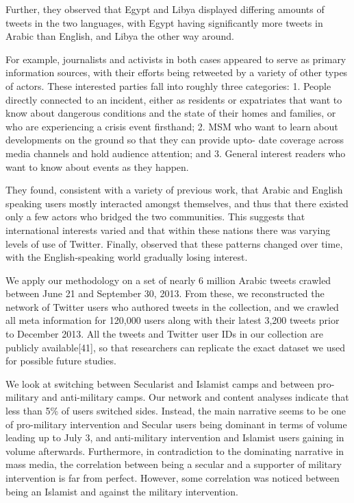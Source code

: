 	\cite{bruns_arab_2013}
		Further, they observed that Egypt and Libya displayed differing amounts of tweets in the two languages, with Egypt having significantly more tweets in Arabic than English, and Libya the other way around.

\cite{lotan_revolutions_2011}
For example, journalists and activists in both cases appeared to serve as primary information sources, with their efforts being retweeted by a variety of other types of actors.    
These interested parties fall into roughly three categories:
1. People directly connected to an incident, either as residents or expatriates that want to
know about dangerous conditions and the state of their homes and families, or who are
experiencing a crisis event firsthand;
2. MSM who want to learn about developments on the ground so that they can provide upto-
date coverage across media channels and hold audience attention; and
3. General interest readers who want to know about events as they happen.

\cite{bruns_arab_2013}   They found, consistent with a variety of previous work, that Arabic and English speaking users mostly interacted amongst themselves, and thus that there existed only a few actors who bridged the two communities.    This suggests that international interests varied and that within these nations there was varying levels of use of Twitter.  Finally, \cite{bruns_arab_2013} observed that these patterns changed over time, with the English-speaking world gradually losing interest. 	

\cite{borge-holthoefer_content_2014}

	We apply our methodology on a set of nearly 6 million Arabic tweets crawled between June 21 and September 30, 2013. From these, we reconstructed the network of Twitter users who authored tweets in the collection, and we crawled all meta information for 120,000 users along with their latest 3,200 tweets prior to December 2013. All the tweets and Twitter user IDs in our collection are publicly available[41], so that researchers can replicate the exact dataset we used for possible future studies.
	
	We look at switching between Secularist and Islamist camps and between pro-military and anti-military camps. Our network and content analyses indicate that less than 5\% of users switched sides. Instead, the main narrative seems to be one of pro-military intervention and Secular users being dominant in terms of volume leading up to July 3, and anti-military intervention and Islamist users gaining in volume afterwards. Furthermore, in contradiction to the dominating narrative in mass media, the correlation between being a secular and a supporter of military intervention is far from perfect. However, some correlation was noticed between being an Islamist and against the military intervention.
	
